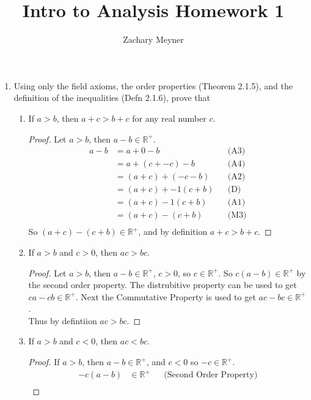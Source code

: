 \documentclass[12pt]{article}
\title{\large Intro to Analysis Homework 1}
\author{\large Zachary Meyner}
\date{}
\begin{document}
\maketitle
\begin{enumerate}
	\item Using only the field axioms, the order properties (Theorem 2.1.5), and the definition of the inequalities
	      (Defn 2.1.6), prove that
	      \begin{enumerate}
		      \item If $a > b$, then $a+c > b+c$ for any real number $c$.
		            \begin{proof} Let $a > b$, then $a-b \in \mathbb{R}^+$.
			            \begin{align*}
				            a-b & = a+0-b         &  & \text{(A3)} \\
				                & = a+(c+-c)-b    &  & \text{(A4)} \\
				                & = (a+c)+(-c-b)  &  & \text{(A2)} \\
				                & = (a+c)+-1(c+b) &  & \text{(D)}  \\
				                & = (a+c)-1(c+b)  &  & \text{(A1)} \\
				                & = (a+c)-(c+b)   &  & \text{(M3)} \\
			            \end{align*}
			            So $(a+c)-(c+b) \in \mathbb{R}^+$, and by definition $a+c > b+c$.
		            \end{proof}
		      \item If $a > b$ and $c > 0$, then $ac > bc$.
		            \begin{proof} Let $a > b$, then $a-b \in \mathbb{R}^+$, $c > 0$, so $c \in \mathbb{R}^+$. So $c(a-b) \in \mathbb{R}^+$
			            by the second order property. The distrubitive property can be used to get $ca - cb \in \mathbb{R}^+$. Next the Commutative
			            Property is used to get $ac-bc \in \mathbb{R}^+$. \\
			            Thus by defintiion $ac > bc$.
		            \end{proof}
		      \item If $a > b$ and $c < 0$, then $ac < bc$.
		            \begin{proof} If $a > b$, then $a-b \in \mathbb{R}^+$, and $c < 0$ so $-c \in \mathbb{R}^+$.
			            \begin{align*}
				            -c(a-b) & \in \mathbb{R}^+ &  & \text{(Second Order Property)} \\

\end{align*}
\end{proof}
\end{enumerate}
\end{enumerate}
\end{document}
